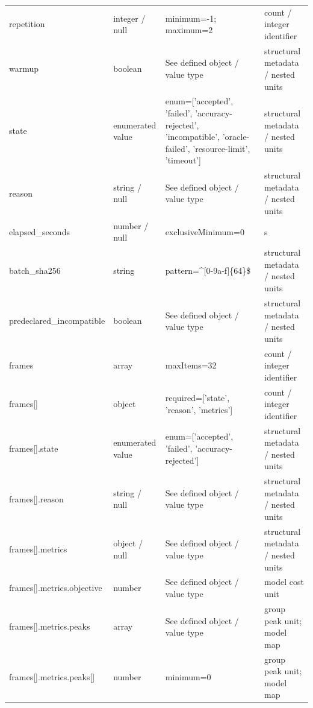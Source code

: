 \begin{longtable}{@{}>{\raggedright\arraybackslash}p{}>{\raggedright\arraybackslash}p{}>{\raggedright\arraybackslash}p{}>{\raggedright\arraybackslash}p{}@{}}
repetition & integer /\allowbreak{} null & minimum=\allowbreak{}-1; maximum=\allowbreak{}2 & count /\allowbreak{} integer identifier\\
warmup & boolean & See defined object /\allowbreak{} value type & structural metadata /\allowbreak{} nested units\\
state & enumerated value & enum=\allowbreak{}['accepted', 'failed', 'accuracy-\allowbreak{}rejected', 'incompatible', 'oracle-\allowbreak{}failed', 'resource-\allowbreak{}limit', 'timeout'] & structural metadata /\allowbreak{} nested units\\
reason & string /\allowbreak{} null & See defined object /\allowbreak{} value type & structural metadata /\allowbreak{} nested units\\
elapsed\_\allowbreak{}seconds & number /\allowbreak{} null & exclusiveMinimum=\allowbreak{}0 & s\\
batch\_\allowbreak{}sha256 & string & pattern=\allowbreak{}\textasciicircum{}[0-9a-\allowbreak{}f]\{64\}\$ & structural metadata /\allowbreak{} nested units\\
predeclared\_\allowbreak{}incompatible & boolean & See defined object /\allowbreak{} value type & structural metadata /\allowbreak{} nested units\\
frames & array & maxItems=\allowbreak{}32 & count /\allowbreak{} integer identifier\\
frames[] & object & required=\allowbreak{}['state', 'reason', 'metrics'] & count /\allowbreak{} integer identifier\\
frames[].\allowbreak{}state & enumerated value & enum=\allowbreak{}['accepted', 'failed', 'accuracy-\allowbreak{}rejected'] & structural metadata /\allowbreak{} nested units\\
frames[].\allowbreak{}reason & string /\allowbreak{} null & See defined object /\allowbreak{} value type & structural metadata /\allowbreak{} nested units\\
frames[].\allowbreak{}metrics & object /\allowbreak{} null & See defined object /\allowbreak{} value type & structural metadata /\allowbreak{} nested units\\
frames[].\allowbreak{}metrics.\allowbreak{}objective & number & See defined object /\allowbreak{} value type & model cost unit\\
frames[].\allowbreak{}metrics.\allowbreak{}peaks & array & See defined object /\allowbreak{} value type & group peak unit; model map\\
frames[].\allowbreak{}metrics.\allowbreak{}peaks[] & number & minimum=\allowbreak{}0 & group peak unit; model map\\

\end{longtable}
